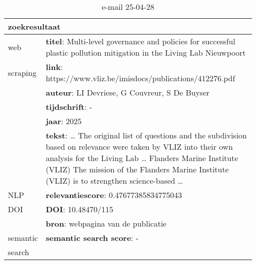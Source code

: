 \begin{table}[h!]
    \caption{e-mail 25-04-28}
    \centering
    \begin{tabularx}{\textwidth}{|p{4cm}|X|} 
        \hline
        \multicolumn{2}{|X|}{\textbf{zoekresultaat}} \\
        \hline
        web &\textbf{titel}: Multi-level governance and policies for successful plastic pollution mitigation in the Living Lab Nieuwpoort\\
        scraping&\textbf{link}: https://www.vliz.be/imisdocs/publications/412276.pdf\\
        &\textbf{auteur}: LI Devriese, G Couvreur, S De Buyser\\
        &\textbf{tijdschrift}: -\\
        &\textbf{jaar}: 2025\\
        &\textbf{tekst}: … The original list of questions and the subdivision based on relevance were taken by VLIZ into their own analysis for the Living Lab … Flanders Marine Institute (VLIZ) The mission of the Flanders Marine Institute (VLIZ) is to strengthen science-based …\\
        \hline
        NLP&\textbf{relevantiescore}: 0.47677385834775043\\
        \hline
        DOI&\textbf{DOI}: 10.48470/115\\
        &\textbf{bron}: webpagina van de publicatie\\
        \hline
        semantic&\textbf{semantic search score}: -\\
        search&\\
        \hline
    \end{tabularx}
    \label{table:email20250428}
\end{table}
